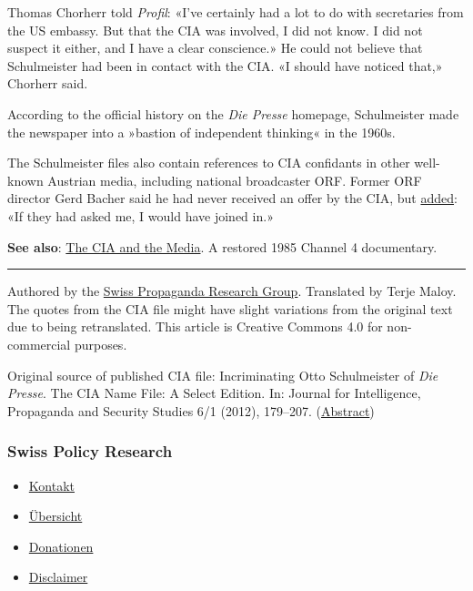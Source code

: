 Thomas Chorherr told \emph{Profil}: «I've certainly had a lot to do with
secretaries from the US embassy. But that the CIA was involved, I did
not know. I did not suspect it either, and I have a clear conscience.»
He could not believe that Schulmeister had been in contact with the CIA.
«I should have noticed that,» Chorherr said.

According to the official history on the \emph{Die Presse} homepage,
Schulmeister made the newspaper into a »bastion of independent thinking«
in the 1960s.

The Schulmeister files also contain references to CIA confidants in
other well-known Austrian media, including national broadcaster ORF.
Former ORF director Gerd Bacher said he had never received an offer by
the CIA, but
\href{https://www.diepresse.com/471594/otto-schulmeister-in-den-akten-der-cia}{added}:
«If they had asked me, I would have joined in.»

\textbf{See also}:
\href{https://swprs.org/video-the-cia-and-the-media/}{The CIA and the
Media}. A restored 1985 Channel 4 documentary.

\begin{center}\rule{0.5\linewidth}{\linethickness}\end{center}

Authored by the \href{https://swprs.org/contact/}{Swiss Propaganda
Research Group}. Translated by Terje Maloy. The quotes from the CIA file
might have slight variations from the original text due to being
retranslated. This article is Creative Commons 4.0 for non-commercial
purposes.

Original source of published CIA file: Incriminating Otto Schulmeister
of \emph{Die Presse}. The CIA Name File: A Select Edition. In: Journal
for Intelligence, Propaganda and Security Studies 6/1 (2012), 179--207.
(\href{http://www.acipss.org/wp-content/uploads/JIPSS_V6N1_extract.pdf}{Abstract})

\hypertarget{swiss-policy-research}{%
\subsubsection{Swiss Policy Research}\label{swiss-policy-research}}

\begin{itemize}
\tightlist
\item
  \href{https://swprs.org/kontakt/}{Kontakt}
\item
  \href{https://swprs.org/uebersicht/}{Übersicht}
\item
  \href{https://swprs.org/donationen/}{Donationen}
\item
  \href{https://swprs.org/disclaimer/}{Disclaimer}
\end{itemize}

